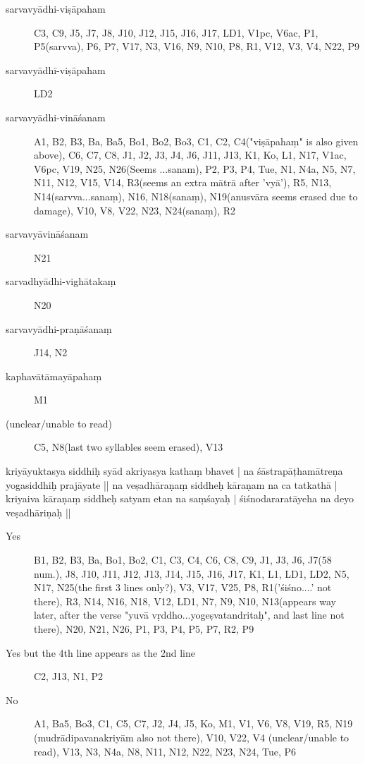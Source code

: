 \begin{ekdosis}
  
  \begin{marma}[hp01_054]
    \begin{description}
    \item[sarvavyādhi-viṣāpaham] C3, C9, J5, J7, J8, J10, J12, J15, J16, J17, LD1, V1pc, V6ac, P1, P5(sarvva), P6, P7, V17, N3, V16, N9, N10, P8, R1, V12, V3, V4, N22, P9
    \item[sarvavyādhī-viṣāpaham] LD2
    \item[sarvavyādhi-vināśanam] A1, B2, B3, Ba, Ba5, Bo1, Bo2, Bo3, C1, C2, C4("viṣāpahaṃ" is also given above), C6, C7, C8, J1, J2, J3, J4, J6, J11, J13, K1, Ko, L1, N17, V1ac, V6pc, V19, N25, N26(Seems ...sanam), P2, P3, P4, Tue, N1, N4a, N5, N7, N11, N12, V15, V14, R3(seems an extra mātrā after 'vyā'), R5, N13, N14(sarvva...sanaṃ), N16, N18(sanaṃ), N19(anusvāra seems erased due to damage), V10, V8, V22, N23, N24(sanaṃ), R2
    \item[sarvavyāvināśanam]   N21
    \item[sarvadhyādhi-vighātakaṃ]   N20
    \item[sarvavyādhi-praṇāśanaṃ]        J14, N2
    \item[kaphavātāmayāpahaṃ]        M1
    \item[(unclear/unable to read)]        C5, N8(last two syllables seem erased), V13
    \end{description}
  \end{marma}


  
  \begin{marma}[hp01_055]

    kriyāyuktasya siddhiḥ syād akriyasya kathaṃ bhavet |
    na śāstrapāṭhamātreṇa yogasiddhiḥ prajāyate ||
    na veṣadhāraṇaṃ siddheḥ kāraṇam na ca tatkathā |
    kriyaiva kāraṇaṃ siddheḥ satyam etan na saṃśayaḥ |
    śiśnodararatāyeha na deyo veṣadhāriṇaḥ ||

    \begin{description}
    \item[Yes] B1, B2, B3, Ba, Bo1, Bo2, C1, C3, C4, C6, C8, C9, J1, J3, J6, J7(58 num.), J8, J10, J11, J12, J13, J14, J15, J16, J17, K1, L1, LD1, LD2, N5, N17, N25(the first 3 lines only?), V3, V17, V25, P8, R1('śiśno....' not there), R3, N14, N16, N18, V12, LD1, N7, N9, N10, N13(appears way later, after the verse "yuvā vṛddho...yogeṣvatandritaḥ", and last line not there), N20, N21, N26, P1, P3, P4, P5, P7, R2, P9
    \item[Yes but the 4th line appears as the 2nd line] C2, J13, N1, P2
    \item[No] A1, Ba5, Bo3, C1, C5, C7, J2, J4, J5, Ko, M1, V1, V6, V8, V19, R5, N19 (mudrādipavanakriyām also not there), V10, V22, V4 (unclear/unable to read), V13, N3, N4a, N8, N11, N12, N22, N23, N24, Tue, P6
    \end{description}


\end{marma}
\end{ekdosis}
